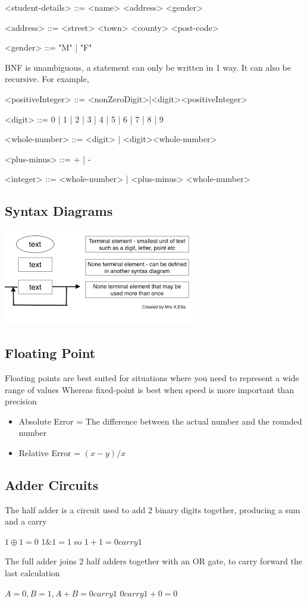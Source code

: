 \documentclass{article}
\begin{document}
\begin{grammar}
<student-details> ::= <name> <address> <gender>

<address> ::= <street> <town> <county> <post-code>

<gender> ::= "M" | "F"
\end{grammar}

BNF is unambiguous, a statement can only be written in 1 way.
It can also be recursive. For example,
\begin{grammar}
<positiveInteger> ::= <nonZeroDigit>|<digit><positiveInteger>
\end{grammar}


\begin{grammar}
<digit> ::= 0 | 1 | 2 | 3 | 4 | 5 | 6 | 7 | 8 | 9

<whole-number> ::= <digit> | <digit><whole-number>

<plus-minus> ::= + | -

<integer> ::= <whole-number> | <plus-minus> <whole-number>
\end{grammar}

\subsection{Syntax Diagrams}
\includegraphics{syntax diagramn.png}

\subsection{Floating Point}
Floating points are best suited for situations where you need to represent a wide range of values
Whereas fixed-point is best when speed is more important than precision

\begin{itemize}
\item Absolute Error = The difference between the actual number and the rounded number
\item Relative Error = $(x - y) / x$
\end{itemize}
\subsection{Adder Circuits}
The half adder is a circuit used to add 2 binary digits together,
producing a sum and a carry

$1 \oplus 1 = 0$
$1 \& 1 = 1$
so
$1 + 1 = 0 carry 1$

The full adder joins 2 half adders together with an OR gate, to carry forward the last calculation

$A = 0, B = 1, A + B = 0 carry 1$
$0 carry 1 + 0 = 0$
\end{document}
